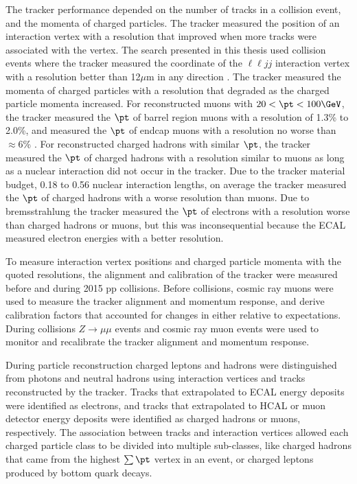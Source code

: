 The tracker performance depended on the number of tracks in a collision event, and the momenta of 
charged particles.  The tracker measured the position of an interaction vertex with a resolution that improved when more 
tracks were associated with the vertex.  The search presented in this thesis used collision events where the tracker 
measured the coordinate of the $\ell\ell jj$ interaction vertex with a resolution better than 12$\mu$m in any direction \cite{trackerPerformanceInCollisions}.  
The tracker measured the momenta of charged particles with a resolution that degraded as the charged particle momenta 
increased.  For reconstructed muons with $20 < \pt < 100\GeV$, the tracker measured the $\pt$ of barrel region muons with a 
resolution of 1.3\% to 2.0\%, and measured the $\pt$ of endcap muons with a resolution no worse than $\approx$6\% \cite{muonRecoFirstCollisions}.  
For reconstructed charged hadrons with similar $\pt$, the tracker measured the $\pt$ of charged hadrons with a resolution 
similar to muons as long as a nuclear interaction did not occur in the tracker. Due to the tracker material budget, 0.18 
to 0.56 nuclear interaction lengths, on average the tracker measured the 
$\pt$ of charged hadrons with a worse resolution than muons.  Due to bremsstrahlung the tracker measured the $\pt$ of 
electrons with a resolution worse than charged hadrons or muons, but this was inconsequential because the ECAL measured 
electron energies with a better resolution.

To measure interaction vertex positions and charged particle momenta with the quoted resolutions, the alignment and calibration 
of the tracker were measured before and during 2015 pp collisions.  Before collisions, cosmic ray muons were 
used to measure the tracker alignment and momentum response, and derive calibration factors that accounted for 
changes in either relative to expectations.  During collisions $Z \rightarrow \mu\mu$ events and cosmic ray muon events 
were used to monitor and recalibrate the tracker alignment and momentum response.

During particle reconstruction charged leptons and hadrons were distinguished from photons and neutral hadrons using 
interaction vertices and tracks reconstructed by the tracker.  Tracks that extrapolated to ECAL energy deposits were 
identified as electrons, and tracks that extrapolated to HCAL or muon detector energy deposits were identified as charged 
hadrons or muons, respectively.  The association between tracks and interaction vertices allowed each charged particle class 
to be divided into multiple sub-classes, like charged hadrons that came from the highest $\sum \pt$ vertex in an event, 
or charged leptons produced by bottom quark decays.


